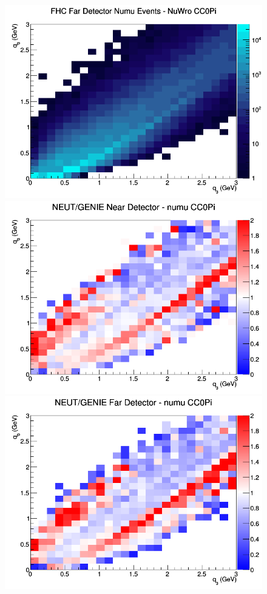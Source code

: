 \begin{figure}[h]
\endminipage
{}
\includegraphics[width=\linewidth]{eff_q0_q3/FGT/CC0Pi_FHC_FD_numu_q3_q0_NuWro.png}
\endminipage
\newline
{}
\includegraphics[width=\linewidth]{eff_q0_q3/FGT/ratios/CC0Pi_NEUT_GENIE_numu_near_q3_q0.png}
\endminipage
{}
\includegraphics[width=\linewidth]{eff_q0_q3/FGT/ratios/CC0Pi_NEUT_GENIE_numu_far_q3_q0.png}

\end{figure}
